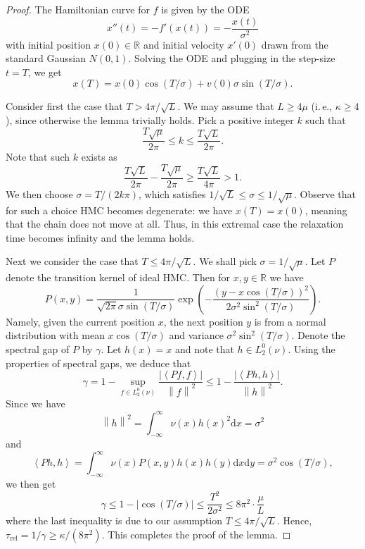 \documentclass[11pt]{article}
\numberwithin{equation}{section}
\theoremstyle{definition}
\theoremstyle{plain}
\newcommand{\R}{\mathbb R}
\newcommand{\ie}{i.\,e.}
\newcommand{\dif}{\mathrm{d}}
\newcommand{\norm}[1]{\left\lVert #1 \right\rVert}
\newcommand{\ip}[2]{\left\langle #1 , #2 \right\rangle}
\newcommand{\Trel}{\tau_{\mathrm{rel}}}
\begin{document}
\begin{proof}
	The Hamiltonian curve for $f$ is given by the ODE
	\[
	x''(t) = - f'(x(t)) = -\frac{x(t)}{\sigma^2}
	\]
	with initial position $x(0) \in \R$ and initial velocity $x'(0)$ drawn from the standard Gaussian $N(0,1)$. 
%
%
%
%
	Solving the ODE and plugging in the step-size $t=T$, we get
	\[
	x(T) = x(0) \cos(T/\sigma) + v(0) \sigma \sin(T/\sigma).
	\]
	
	Consider first the case that $T > 4\pi/\sqrt{L}$. 
	We may assume that $L \ge 4\mu$ (\ie, $\kappa \ge 4$), since otherwise the lemma trivially holds. 
	Pick a positive integer $k$ such that
	\[
	\frac{T\sqrt{\mu}}{2\pi} \le k \le \frac{T\sqrt{L}}{2\pi}.
	\]
	Note that such $k$ exists as
	\[
	\frac{T\sqrt{L}}{2\pi} - \frac{T\sqrt{\mu}}{2\pi} \ge \frac{T\sqrt{L}}{4\pi} > 1.
	\]
	We then choose
	$\sigma = T/(2k\pi)$, 
	which satisfies $1/\sqrt{L} \le \sigma \le 1/\sqrt{\mu}$. 
	Observe that for such a choice HMC becomes degenerate: we have $x(T) = x(0)$, meaning that the chain does not move at all. 
	Thus, in this extremal case the relaxation time becomes infinity and the lemma holds.
	
	Next we consider the case that $T \le 4\pi/\sqrt{L}$.
	We shall pick $\sigma = 1/\sqrt{\mu}$. 
	Let $P$ denote the transition kernel of ideal HMC. 
	Then for $x,y\in\R$ we have
	\[
	P(x,y) = \frac{1}{\sqrt{2\pi} \sigma \sin(T/\sigma)} \exp\left( - \frac{\left( y - x\cos(T/\sigma) \right)^2}{2\sigma^2 \sin^2(T/\sigma)} \right).
	\] 
	Namely, given the current position $x$, the next position $y$ is from a normal distribution with mean $x\cos(T/\sigma)$ and variance $\sigma^2 \sin^2(T/\sigma)$. 
	Denote the spectral gap of $P$ by $\gamma$. 
	Let $h(x) = x$ and note that $h\in L^0_2(\nu)$. Using the properties of spectral gaps, we deduce that
	\[
	\gamma 
	= 1 - \sup_{f\in L_2^0(\nu)} \frac{|\ip{P f}{f}|}{\norm{f}^2}
	\le 1 - \frac{|\ip{P h}{h}|}{\norm{h}^2}. 
	\]
	Since we have
	\[
	\norm{h}^2 = \int_{-\infty}^{\infty} \nu(x) h(x)^2 \dif x = \sigma^2
	\]
	and
	\[
	\ip{P h}{h} = \int_{-\infty}^{\infty} \nu(x) P(x,y) h(x) h(y) \dif x \dif y = \sigma^2 \cos(T/\sigma),
	\]
	we then get 
	\[
	\gamma \le 1 - |\cos(T/\sigma)| 
	\le \frac{T^2}{2\sigma^2} \le 8\pi^2 \cdot \frac{\mu}{L}
	\]
	where the last inequality is due to our assumption $T \le 4\pi/\sqrt{L}$. 
	Hence, $\Trel = 1/\gamma \ge \kappa/(8\pi^2)$. 
	This completes the proof of the lemma. 
\end{proof}

%
%
%
%
%
%
%
%
%
%
%
%
%
%
%
%
%
%
%
%
%
%
%
%
%
%
%
%
%
%
%
%
%
%
%
%
%
%
%
%
%
%
%
%
%
%
%
%
%
%
%
%
%
%
%
%
%
%
%
%
%
%
%
%
%
%
%
%
%
%
%
%
%
%
%
%
%
%
%
%
%
%
%
%
%
%
%
\end{document}
